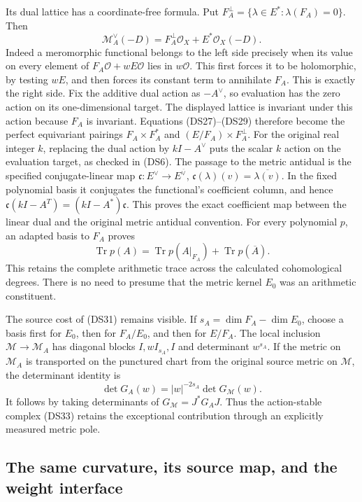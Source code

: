 Its dual lattice has a coordinate-free formula.  Put
$F_A^\perp=\{\lambda\in E^*: \lambda(F_A)=0\}$.  Then
\[
 \mathcal M_A^\vee(-D)=F_A^\perp\mathcal O_X+E^*\mathcal O_X(-D).
 \tag{DS34}
\]
Indeed a meromorphic functional belongs to the left side precisely
when its value on every element of $F_A\mathcal O+wE\mathcal O$
lies in $w\mathcal O$.  This first forces it to be holomorphic,
by testing $wE$, and then forces its constant term to annihilate
$F_A$.  This is exactly the right side.  Fix the additive dual
action as $-A^\vee$, so evaluation has the zero action on its
one-dimensional target.  The displayed lattice is invariant under
this action because $F_A$ is invariant.  Equations (DS27)--(DS29)
therefore become the perfect equivariant pairings
$F_A\times F_A^*$ and $(E/F_A)\times F_A^\perp$.
For the original real integer $k$, replacing the dual action by
$kI-A^\vee$ puts the scalar $k$ action on the evaluation target,
as checked in (DS6).  The passage to the metric antidual is the
specified conjugate-linear map
$\mathfrak c:E^\vee\to E^{\overline\vee}$,
$\mathfrak c(\lambda)(v)=\overline{\lambda(v)}$.
In the fixed polynomial basis it conjugates the functional's
coefficient column, and hence
$\mathfrak c(kI-A^T)=(kI-A^*)\mathfrak c$.
This proves the exact coefficient map between the linear dual and
the original metric antidual convention.
For every polynomial $p$, an adapted basis to $F_A$ proves
\[
 \operatorname{Tr}p(A)=
 \operatorname{Tr}p(A|_{F_A})+
 \operatorname{Tr}p(\overline A).
 \tag{DS35}
\]
This retains the complete arithmetic trace across the calculated
cohomological degrees.  There is no need to presume that the metric
kernel $E_0$ was an arithmetic constituent.

The source cost of (DS31) remains visible.  If
$s_A=\dim F_A-\dim E_0$, choose a basis first for $E_0$, then for
$F_A/E_0$, and then for $E/F_A$.  The local inclusion
$\mathcal M\to\mathcal M_A$ has diagonal blocks
$I,wI_{s_A},I$ and determinant $w^{s_A}$.  If the metric on
$\mathcal M_A$ is transported on the punctured chart from the
original source metric on $\mathcal M$, the determinant identity is
\[
 \det G_A(w)=|w|^{-2s_A}\det G_{\mathcal M}(w).
 \tag{DS36}
\]
It follows by taking determinants of $G_{\mathcal M}=J^*G_AJ$.
Thus the action-stable complex (DS33) retains the exceptional
contribution through an explicitly measured metric pole.

\subsection{The same curvature, its source map, and the weight interface}

